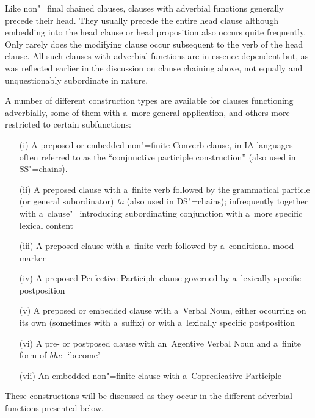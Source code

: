 Like non"=final chained clauses, clauses with adverbial functions generally precede their head. They usually precede the entire head clause although embedding into the head clause or head proposition also occurs quite frequently. Only rarely does the modifying clause occur subsequent to the verb of the head clause. All such clauses with adverbial functions are in essence dependent but, as was reflected earlier in the discussion on clause chaining above, not equally and unquestionably subordinate in nature. 



A number of different construction types are available for clauses functioning adverbially, some of them with a~more general application, and others more restricted to certain subfunctions:


\begin{enumerate}
\item[(i)] A preposed or embedded non"=finite Converb clause, in IA languages often referred to as the ``conjunctive participle construction'' (also used in SS"=chains).

\item[(ii)] A preposed clause with a~finite verb followed by the grammatical particle (or general subordinator) \textit{ta} (also used in DS"=chains); infrequently together with a~clause"=introducing subordinating conjunction with a~more specific lexical content

\item[(iii)] A preposed clause with a~finite verb followed by a~conditional mood marker

\item[(iv)] A preposed Perfective Participle clause governed by a~lexically specific postposition

\item[(v)] A preposed or embedded clause with a~Verbal Noun, either occurring on its own (sometimes with a~suffix) or with a~lexically specific postposition

\item[(vi)] A pre- or postposed clause with an~Agentive Verbal Noun and a~finite form of \textit{bhe-} `become'

\item[(vii)] An embedded non"=finite clause with a~Copredicative Participle
\end{enumerate}

These constructions will be discussed as they occur in the different adverbial functions presented below. 


